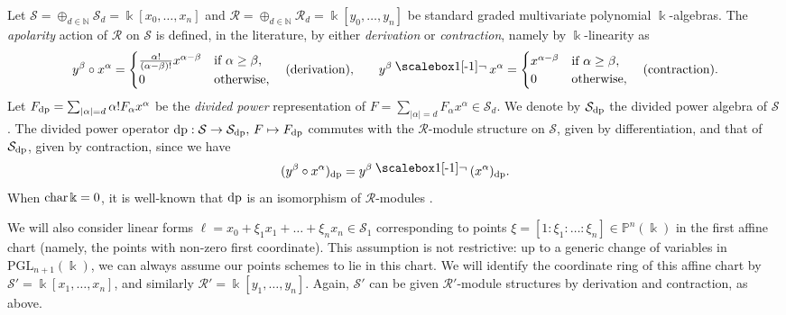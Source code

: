 \documentclass{amsart}
\theoremstyle{plain}
\renewcommand{\k}{\Bbbk}
\newcommand{\Char}{\textnormal{char}\,}
\renewcommand{\S}{\mathcal{S}}
\newcommand{\N}{\mathbb{N}}
\renewcommand{\P}{\mathbb{P}}
\def\a{\alpha}
\def\b{\beta}
\newcommand{\contract}{\mathbin{\mathpalette\dointprod\relax}}
\newcommand{\dointprod}[2]{%
  \raisebox{\depth}{\scalebox{1}[-1]{$#1\lnot$}}}
\def\\k{{\mathsf{k}}}
\def\P{{\mathbb{P}}}
\def\R{\mathcal{R}}
\def\PGL{\mathrm{PGL}}
\numberwithin{equation}{section}
\begin{document}
Let $\S = \oplus_{d \in \N} \S_d = \k[x_0, \dots, x_n]$ and $\R = \oplus_{d \in \N} \R_d = \k[y_0, \dots, y_n]$ be standard graded multivariate polynomial $\k$-algebras.
The \emph{apolarity} action of $\R$ on $\S$ is defined, in the literature, by either \emph{derivation} or \emph{contraction}, namely by $\k$-linearity as
\[ y^{\b} \circ x^{\a} = \begin{cases}
    \frac{\a!}{(\a-\b)!} x^{\a-\b} & \textnormal{if } \a \geq \b,\\
    0 & \textnormal{otherwise},
\end{cases} \quad \textnormal{(derivation),} \qquad 
y^{\b} \contract x^{\a} = \begin{cases}
    x^{\a-\b} & \textnormal{if } \a \geq \b,\\
    0 & \textnormal{otherwise},
\end{cases} \quad \textnormal{(contraction).}
\]
Let $F_{\rm dp} = \sum_{|\a|=d} \a!F_{\a}x^{\a}$ be the \emph{divided power} representation of $F = \sum_{|\a|=d} F_{\a}x^{\a} \in \S_d$.
We denote by $\S_{\rm dp}$ the divided power algebra of $\S$ \cite[§9]{G96}.
The divided power operator ${\rm dp} : \S \to \S_{\rm dp},\, F \mapsto F_{\rm dp}$ commutes with the $\R$-module structure on $\S$, given by differentiation, and that of $\S_{\rm dp}$, given by contraction, since we have
\begin{equation} \label{eq:circvscontract}
( y^{\b} \circ x^{\a} )_{\rm dp} = y^{\b} \contract ( x^{\a} )_{\rm dp}.
\end{equation}
When $\Char \k = 0$, it is well-known that ${\rm dp}$ is an isomorphism of $\R$-modules \cite[Thm. 9.5]{G96}.

We will also consider linear forms $\ell = x_0 + \xi_1 x_1 + \dots + \xi_n x_n \in \S_1$ corresponding to points $\xi = [1:\xi_1:\dots:\xi_n] \in \P^n(\k)$ in the first affine chart (namely, the points with non-zero first coordinate).
This assumption is not restrictive: up to a generic change of variables in $\PGL_{n+1}(\k)$, we can always assume our points schemes to lie in this chart.
We will identify the coordinate ring of this affine chart by $\S' = \k[x_1,\ldots,x_n]$, and similarly $\R'=\k[y_1,\ldots,y_n]$.
Again, $\S'$ can be given $\R'$-module structures by derivation and contraction, as above.
\end{document}

